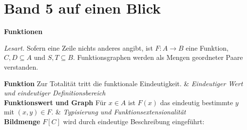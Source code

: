 \chapter[Band 5: Funktionen]{Band 5 auf einen Blick}
\noindent\textbf{Funktionen}\par\medskip
\noindent\emph{Lesart.} Sofern eine Zeile nichts anderes angibt,
ist \(F\colon A\to B\) eine Funktion, \(C,D\subseteq A\) und
\(S,T\subseteq B\). Funktionsgraphen werden als Mengen geordneter Paare
verstanden.
\begin{BandUebersicht}
\textbf{Funktion}
Zur Totalität tritt die funktionale Eindeutigkeit.
&
\textit{Eindeutiger Wert und eindeutiger Definitionsbereich}
\\
\addlinespace[.8ex]
\textbf{Funktionswert und Graph}
Für \(x\in A\) ist \(F(x)\) das eindeutig bestimmte \(y\) mit
\((x,y)\in F\).
&
\textit{Typisierung und Funktionsextensionalität}
\\
\addlinespace[.8ex]
\textbf{Bildmenge}
\(F[C]\) wird durch eindeutige Beschreibung eingeführt:

\end{BandUebersicht}
